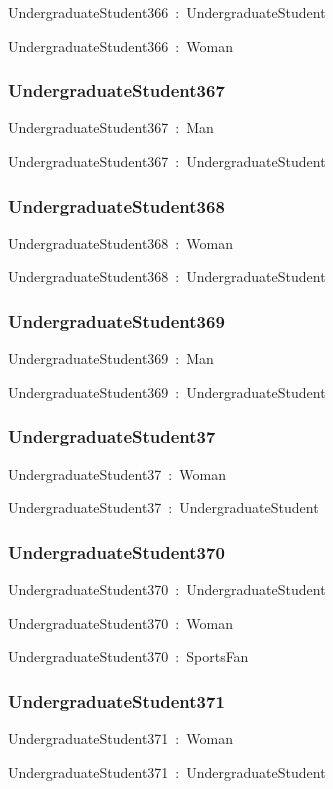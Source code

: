 \documentclass{article}
\begin{document}
UndergraduateStudent366~:~UndergraduateStudent

UndergraduateStudent366~:~Woman

\subsubsection*{UndergraduateStudent367}

UndergraduateStudent367~:~Man

UndergraduateStudent367~:~UndergraduateStudent

\subsubsection*{UndergraduateStudent368}

UndergraduateStudent368~:~Woman

UndergraduateStudent368~:~UndergraduateStudent

\subsubsection*{UndergraduateStudent369}

UndergraduateStudent369~:~Man

UndergraduateStudent369~:~UndergraduateStudent

\subsubsection*{UndergraduateStudent37}

UndergraduateStudent37~:~Woman

UndergraduateStudent37~:~UndergraduateStudent

\subsubsection*{UndergraduateStudent370}

UndergraduateStudent370~:~UndergraduateStudent

UndergraduateStudent370~:~Woman

UndergraduateStudent370~:~SportsFan

\subsubsection*{UndergraduateStudent371}

UndergraduateStudent371~:~Woman

UndergraduateStudent371~:~UndergraduateStudent
\end{document}
